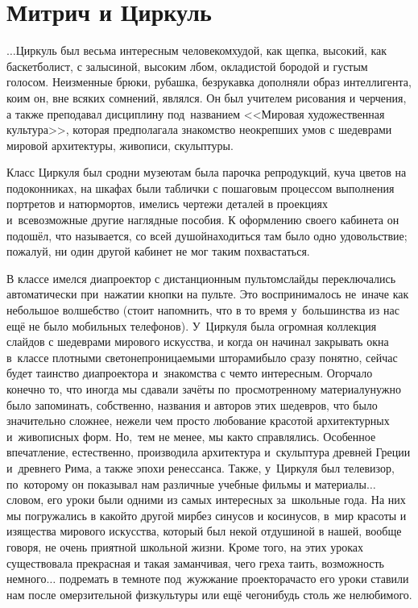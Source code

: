 \newpage
\section*{Митрич и Циркуль}

$\ldots$Циркуль был весьма интересным человеком\mdash худой, как щепка, высокий, как баскетболист, с залысиной, высоким лбом, окладистой бородой и густым голосом. Неизменные брюки, рубашка, безрукавка дополняли образ интеллигента, коим он, вне всяких сомнений, являлся. Он был учителем рисования и черчения, а также преподавал дисциплину под~названием <<Мировая художественная культура>>, которая предполагала знакомство неокрепших умов с шедеврами мировой архитектуры, живописи, скульптуры. 

Класс Циркуля был сродни музею\mdash там была парочка репродукций, куча цветов на подоконниках, на шкафах были таблички с пошаговым процессом выполнения портретов и натюрмортов, имелись чертежи деталей в проекциях и~всевозможные другие наглядные пособия. К оформлению своего кабинета он подошёл, что называется, со всей душой\mdash находиться там было одно удовольствие; пожалуй, ни один другой кабинет не мог таким похвастаться. 

В классе имелся диапроектор с дистанционным пультом\mdash слайды переключались автоматически при~нажатии кнопки на пульте. Это воспринималось не~иначе как небольшое волшебство (стоит напомнить, что в то время у~большинства из нас ещё не было мобильных телефонов). У~Циркуля была огромная коллекция слайдов с шедеврами мирового искусства, и когда он начинал закрывать окна в~классе плотными светонепроницаемыми шторами\mdash было сразу понятно, сейчас будет таинство диапроектора и~знакомства с чем\sdash то интересным. Огорчало конечно то, что иногда мы сдавали зачёты по~просмотренному материалу\mdash нужно было запоминать, собственно, названия и авторов этих шедевров, что было значительно сложнее, нежели чем просто любование красотой архитектурных и~живописных форм. Но,~тем не менее, мы как\sdash то справлялись. Особенное впечатление, естественно, производила архитектура и~скульптура древней Греции и~древнего Рима, а также эпохи ренессанса. Также, у~Циркуля был телевизор, по~которому он показывал нам различные учебные фильмы и материалы$\ldots$ словом, его уроки были одними из самых интересных за~школьные года. На них мы погружались в какой\sdash то другой мир\mdash без синусов и косинусов, в~мир красоты и изящества мирового искусства, который был некой отдушиной в нашей, вообще говоря, не очень приятной школьной жизни. Кроме того, на этих уроках существовала прекрасная и такая заманчивая, чего греха таить, возможность немного$\ldots$ подремать в темноте под~жужжание проектора\mdash часто его уроки ставили нам после омерзительной физкультуры или ещё чего\sdash нибудь столь же нелюбимого.

